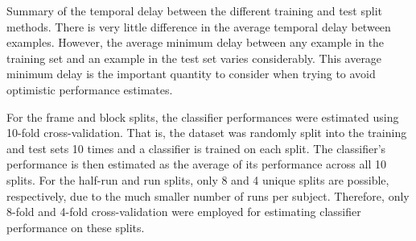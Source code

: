 \documentclass[review,1p,authoryear]{elsarticle}
\begin{document}
\begin{table}
\centering

\caption{Summary of the temporal delay between the different training and test split methods.
There is very little difference in the average temporal delay between examples.
However, the average minimum delay between any example in the training set and an example in the test set varies considerably.
This average minimum delay is the important quantity to consider when trying to avoid optimistic performance estimates.}
\label{tab:training-split}
\end{table}

For the frame and block splits, the classifier performances were estimated using 10-fold cross-validation.
That is, the dataset was randomly split into the training and test sets 10 times and a classifier is trained on each split.
The classifier's performance is then estimated as the average of its performance across all 10 splits.
For the half-run and run splits, only 8 and 4 unique splits are possible, respectively, due to the much smaller number of runs per subject. 
Therefore, only 8-fold and 4-fold cross-validation were employed for estimating classifier performance on these splits.


\end{document}
